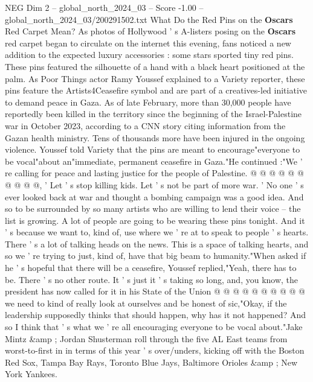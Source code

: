 \begin{textsample}{NEG Dim 2 – global\_north\_2024\_03 – Score -1.00 – global\_north\_2024\_03/200291502.txt}  \label{ex:f2_neg_074}
What Do the Red Pins on the \textbf{Oscars} Red Carpet Mean?
As photos of Hollywood ' s A-listers posing on the \textbf{Oscars} red carpet began to circulate on the internet this evening, fans noticed a new addition to the expected luxury accessories : some stars sported tiny red pins.
These pins featured the silhouette of a hand with a black heart positioned at the palm.
As Poor Things actor Ramy Youssef explained to a Variety reporter, these pins feature the Artists4Ceasefire symbol and are part of a creatives-led initiative to demand peace in Gaza.
As of late February, more than 30,000 people have reportedly been killed in the territory since the beginning of the Israel-Palestine war in October 2023, according to a CNN story citing information from the Gazan health ministry.
Tens of thousands more have been injured in the ongoing violence.
Youssef told Variety that the pins are meant to encourage"everyone to be vocal"about an"immediate, permanent ceasefire in Gaza."He continued :"We ' re calling for peace and lasting justice for the people of Palestine. @ @ @ @ @ @ @ @ @ @, ' Let ' s stop killing kids.
Let ' s not be part of more war. ' No one ' s ever looked back at war and thought a bombing campaign was a good idea.
And so to be surrounded by so many artists who are willing to lend their voice -- the list is growing.
A lot of people are going to be wearing these pins tonight.
And it ' s because we want to, kind of, use where we ' re at to speak to people ' s hearts.
There ' s a lot of talking heads on the news.
This is a space of talking hearts, and so we ' re trying to just, kind of, have that big beam to humanity."When asked if he ' s hopeful that there will be a ceasefire, Youssef replied,"Yeah, there has to be.
There ' s no other route.
It ' s just it ' s taking so long, and, you know, the president has now called for it in his State of the Union @ @ @ @ @ @ @ @ @ @ we need to kind of really look at ourselves and be honest of sic,"Okay, if the leadership supposedly thinks that should happen, why has it not happened?
And so I think that ' s what we ' re all encouraging everyone to be vocal about."Jake Mintz \&amp ; Jordan Shusterman roll through the five AL East teams from worst-to-first in in terms of this year ' s over/unders, kicking off with the Boston Red Sox, Tampa Bay Rays, Toronto Blue Jays, Baltimore Orioles \&amp ; New York Yankees.

\end{textsample}
